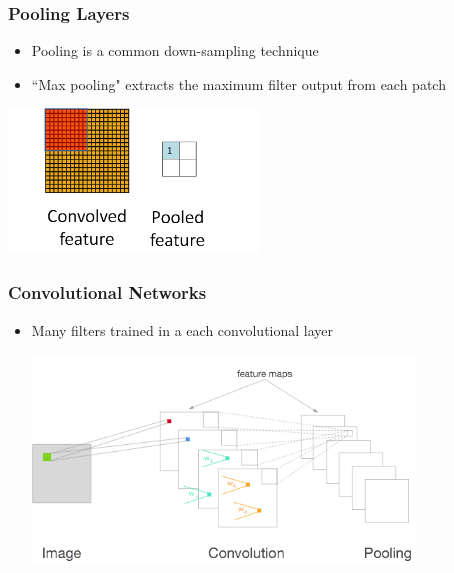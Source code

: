\documentclass[10pt,professionalfonts,xcolor=table]{beamer}
\begin{document}
\begin{frame}
\frametitle{Pooling Layers}
\begin{itemize}
  \item Pooling is a common down-sampling technique
\gap
  \item ``Max pooling" extracts the maximum filter output from each patch
\end{itemize}
\gap
\gap
\centering
 \includegraphics[width=0.5\textwidth]{figures/figures/pooling.png}
\end{frame}


\begin{frame}
\frametitle{Convolutional Networks}
\begin{itemize}
  \item Many filters trained in a each convolutional layer
  \gap

  \begin{center}
 \includegraphics[width=0.8\textwidth]{figures/figures/convnet.png}
 \end{center}

\end{itemize}
\end{frame}
\end{document}
